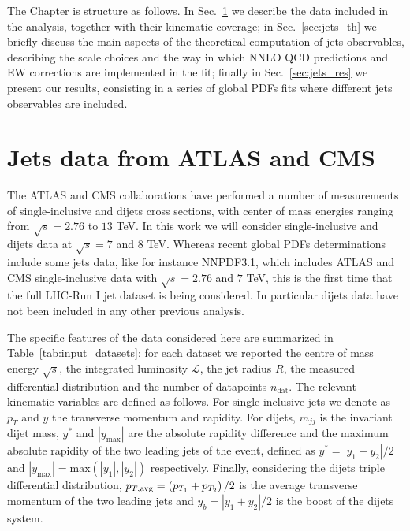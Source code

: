 %
The Chapter is structure as follows. In Sec.~\ref{sec:jets_data} we describe the data included in the analysis,
together with their kinematic coverage; in Sec.~\ref{sec:jets_th} we briefly discuss the main aspects of the theoretical
computation of jets observables, describing the scale choices and the way in which NNLO QCD predictions and EW corrections 
are implemented in the fit; finally in Sec.~\ref{sec:jets_res} we present our results, consisting in a series of global
PDFs fits where different jets observables are included.

\section{Jets data from ATLAS and CMS}
\label{sec:jets_data}
The ATLAS and CMS collaborations have performed a number of measurements of single-inclusive and 
dijets cross sections, with center of mass energies ranging from $\sqrt{s}=2.76$ to $13$ TeV.
In this work we will consider single-inclusive and dijets data at $\sqrt{s}=7$ and $8$ TeV.
%
Whereas recent global PDFs determinations include some jets data, like for instance NNPDF3.1, which includes ATLAS and CMS 
single-inclusive data with $\sqrt{s}=2.76$ and $7$ TeV, this is the first time that the full LHC-Run I jet dataset is being 
considered. In particular dijets data have not been included in any other previous analysis.

%
The specific features of the data considered here are summarized in Table~\ref{tab:input_datasets}:
for each dataset we reported the centre of mass energy $\sqrt{s}$, 
the integrated luminosity $\mathcal{L}$, the jet radius $R$,
the measured differential distribution and the number of datapoints $n_{\text{dat}}$.
The relevant kinematic variables are defined as follows.
For single-inclusive jets we denote as $p_T$ and $y$ the transverse momentum and rapidity.
For dijets, $m_{jj}$ is the invariant dijet mass, $y^*$ and $|y_{\text{max}}|$ are the absolute rapidity difference
and the maximum absolute rapidity of the two leading jets of the event, defined as $y^*=|y_1-y_2|/2$
and $|y_{\text{max}}|= \text{max}\left(|y_1|,|y_2|\right)$ respectively.
Finally, considering the dijets triple differential distribution,
$p_{T,\rm avg} = \left(p_{T_1}+p_{T_2}\right)/2$ is the average transverse momentum of the two leading jets and 
$y_b = |y_1+y_2|/2$ is the boost of the dijets system.

